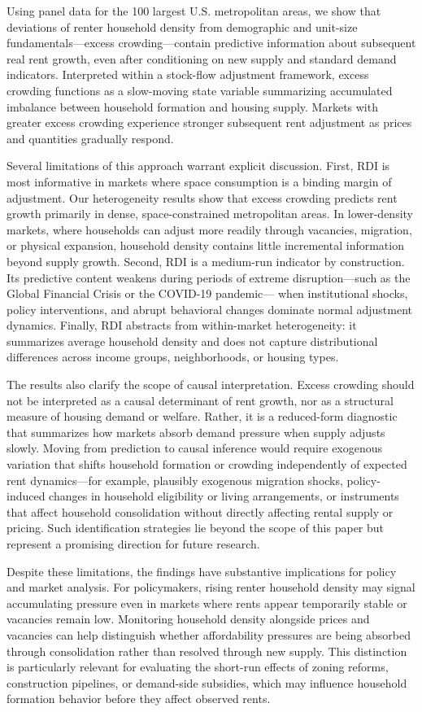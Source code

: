 \documentclass[pdflatex,sn-basic]{sn-jnl}%
\theoremstyle{thmstyleone}%
\theoremstyle{thmstyletwo}%
\theoremstyle{thmstylethree}%
\begin{document}
Using panel data for the 100 largest U.S. metropolitan areas, we show that deviations
of renter household density from demographic and unit-size fundamentals—excess
crowding—contain predictive information about subsequent real rent growth, even after
conditioning on new supply and standard demand indicators. Interpreted within a
stock-flow adjustment framework, excess crowding functions as a slow-moving state
variable summarizing accumulated imbalance between household formation and housing
supply. Markets with greater excess crowding experience stronger subsequent rent
adjustment as prices and quantities gradually respond.

Several limitations of this approach warrant explicit discussion. First, RDI is most
informative in markets where space consumption is a binding margin of adjustment.
Our heterogeneity results show that excess crowding predicts rent growth primarily in
dense, space-constrained metropolitan areas. In lower-density markets, where households
can adjust more readily through vacancies, migration, or physical expansion, household
density contains little incremental information beyond supply growth. Second, RDI is a
medium-run indicator by construction. Its predictive content weakens during periods of
extreme disruption—such as the Global Financial Crisis or the COVID-19 pandemic—
when institutional shocks, policy interventions, and abrupt behavioral changes dominate
normal adjustment dynamics. Finally, RDI abstracts from within-market heterogeneity:
it summarizes average household density and does not capture distributional differences
across income groups, neighborhoods, or housing types.

The results also clarify the scope of causal interpretation. Excess crowding should not
be interpreted as a causal determinant of rent growth, nor as a structural measure of
housing demand or welfare. Rather, it is a reduced-form diagnostic that summarizes how
markets absorb demand pressure when supply adjusts slowly. Moving from prediction to
causal inference would require exogenous variation that shifts household formation or
crowding independently of expected rent dynamics—for example, plausibly exogenous
migration shocks, policy-induced changes in household eligibility or living
arrangements, or instruments that affect household consolidation without directly
affecting rental supply or pricing. Such identification strategies lie beyond the scope
of this paper but represent a promising direction for future research.

Despite these limitations, the findings have substantive implications for policy and
market analysis. For policymakers, rising renter household density may signal
accumulating pressure even in markets where rents appear temporarily stable or
vacancies remain low. Monitoring household density alongside prices and vacancies can
help distinguish whether affordability pressures are being absorbed through
consolidation rather than resolved through new supply. This distinction is particularly
relevant for evaluating the short-run effects of zoning reforms, construction pipelines,
or demand-side subsidies, which may influence household formation behavior before
they affect observed rents.
\end{document}
